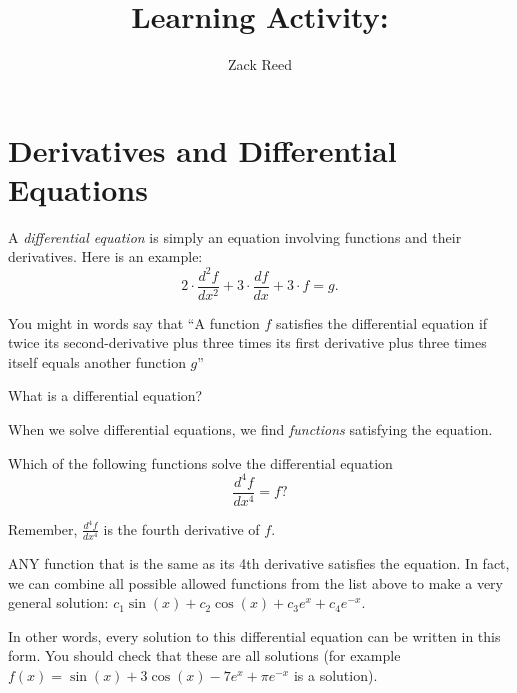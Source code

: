 \documentclass{ximera}
\author{Zack Reed}
\title{Learning Activity: }
\begin{document}
\begin{abstract}


\end{abstract}
\maketitle

\section{Derivatives and Differential Equations}

A \textit{differential equation} is
simply an equation involving functions and their derivatives. Here is an example:
\[
2\cdot \frac{d^2f}{dx^2} + 3\cdot \frac{df}{dx} + 3\cdot f = g.
\]

You might in words say that ``A function $f$ satisfies the differential equation if twice its second-derivative plus three times its first derivative plus three times itself equals another function $g$''

\begin{question}
  What is a differential equation?
  \begin{multipleChoice}
  \end{multipleChoice}
\end{question}

When we solve differential equations, we find
\textit{functions} satisfying the equation.
\begin{question}
  Which of the following functions solve the differential equation
  \[
  \frac{d^4f}{dx^4} = f?
  \]

  \begin{hint}
    Remember, $\frac{d^4f}{dx^4}$ is the fourth derivative of $f$.
  \end{hint}

  \begin{selectAll}
  \end{selectAll}
  \begin{feedback}
    ANY function that is the same as its 4th derivative satisfies the equation. 
    In fact, we can combine all possible allowed functions from the list above to make a very general solution: $c_1\sin(x)+c_2\cos(x)+c_3e^x+c_4e^{-x}$.  
    
    In other words, every
    solution to this differential equation can be written in this form.
    You should check that these are all solutions (for example $f(x) =
    \sin(x)+3\cos(x)-7e^x+\pi e^{-x}$ is a solution). 
  \end{feedback}
\end{question}
\end{document}

